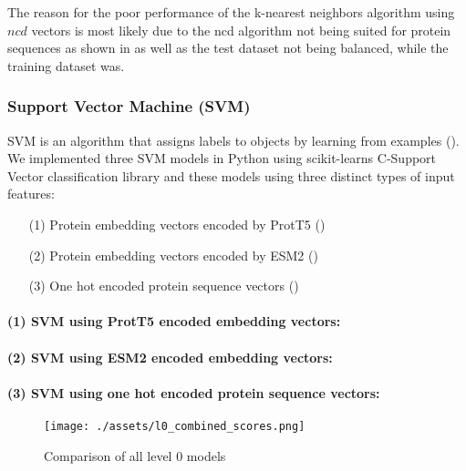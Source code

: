 \documentclass{bioinfo}
\begin{document}
The reason for the poor performance of the k-nearest neighbors algorithm using $ncd$ vectors is
most likely due to the ncd algorithm not being suited for protein sequences as shown in \cite{GzipProteinCompression} as well as
the test dataset not being balanced, while the training dataset was.

\subsubsection{Support Vector Machine (SVM)}
SVM is an algorithm that assigns labels to objects by learning from examples (\cite{svm}).
We implemented three SVM models in Python using scikit-learns C-Support Vector classification library and these models using three distinct types of 
input features: 
\begin{enumerate}
	\item[(1)] Protein embedding vectors encoded by ProtT5 (\cite{ProtT5})
	\item[(2)] Protein embedding vectors encoded by ESM2 (\cite{ESM2})
	\item[(3)] One hot encoded protein sequence vectors (\cite{oh_encoding})
\end{enumerate}

%

\paragraph{(1) SVM using ProtT5 encoded embedding vectors:}

\lipsum[1]
\paragraph{(2) SVM using ESM2 encoded embedding vectors:}

\lipsum[1]
\paragraph{(3) SVM using one hot encoded protein sequence vectors:}
\lipsum[1]


\begin{figure}[!tb]
	\texttt{[image: ./assets/l0\_combined\_scores.png]}
	\caption{Comparison of all level 0 models}
	\label{fig:l0_comp_all}
\end{figure}

\newpage

 

\end{document}
